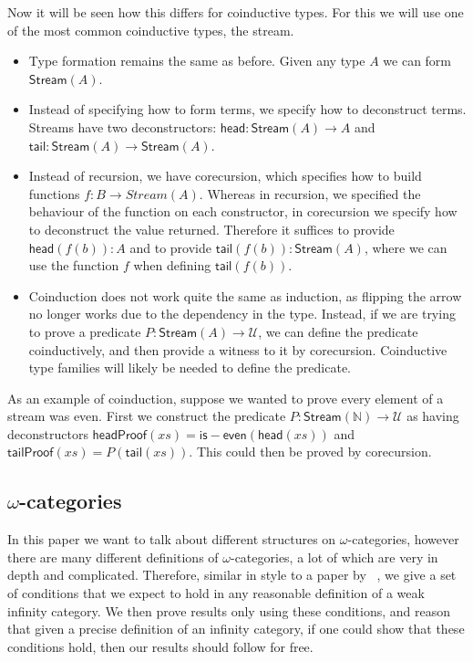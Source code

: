 \documentclass{article}
\theoremstyle{definition}
\theoremstyle{examplestyle}
\begin{document}
Now it will be seen how this differs for coinductive types. For this we will use one of the most common coinductive types, the stream.

\begin{itemize}
\item Type formation remains the same as before. Given any type \(A\) we can form \(\mathsf{Stream}(A)\).
\item Instead of specifying how to form terms, we specify how to deconstruct terms. Streams have two deconstructors: \(\mathsf{head} : \mathsf{Stream}(A) \to A\) and \(\mathsf{tail} : \mathsf{Stream}(A) \to \mathsf{Stream}(A)\).
\item Instead of recursion, we have corecursion, which specifies how to build functions \(f : B \to Stream(A)\). Whereas in recursion, we specified the behaviour of the function on each constructor, in corecursion we specify how to deconstruct the value returned. Therefore it suffices to provide \(\mathsf{head}(f(b)) : A\) and to provide \(\mathsf{tail}(f(b)) : \mathsf{Stream}(A)\), where we can use the function \(f\) when defining \(\mathsf{tail}(f(b))\).
\item Coinduction does not work quite the same as induction, as flipping the arrow no longer works due to the dependency in the type. Instead, if we are trying to prove a predicate \(P : \mathsf{Stream}(A) \to \mathcal{U}\), we can define the predicate coinductively, and then provide a witness to it by corecursion. Coinductive type families will likely be needed to define the predicate.
\end{itemize}

As an example of coinduction, suppose we wanted to prove every element of a stream was even. First we construct the predicate \(P : \mathsf{Stream}(\mathbb{N}) \to \mathcal{U}\) as having deconstructors \(\mathsf{headProof}(xs) = \mathsf{is-even}(\mathsf{head}(xs))\) and \(\mathsf{tailProof}(xs) = P(\mathsf{tail}(xs))\). This could then be proved by corecursion.

\subsection{\(\omega\)-categories}\label{sec:categories}

In this paper we want to talk about different structures on \(\omega\)-categories, however there are many different definitions of \(\omega\)-categories, a lot of which are very in depth and complicated. Therefore, similar in style to a paper by \citeauthor{Cheng2007}~\cite{Cheng2007}, we give a set of conditions that we expect to hold in any reasonable definition of a weak infinity category. We then prove results only using these conditions, and reason that given a precise definition of an infinity category, if one could show that these conditions hold, then our results should follow for free.
\end{document}
